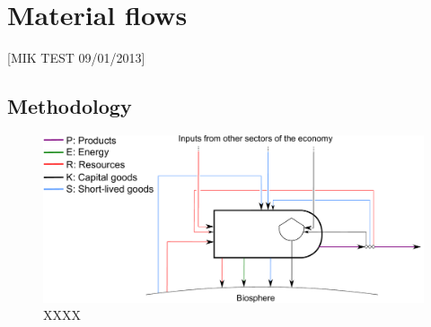 %
%
%
\chapter{Material flows}
\label{chap:materials} 




[MIK TEST 09/01/2013]

\section{Methodology}



\begin{figure}[h!]
\centering
\includegraphics[width=0.8\linewidth]{Part_1/Chapter_Materials/images/PERKS_basic_unit_materials.pdf}
\caption{XXXX}
\label{fig:PERKS_materials}
\end{figure}

